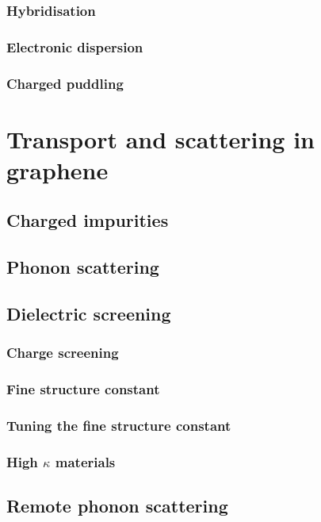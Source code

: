 \documentclass[../Matt_Gebert_Honours_Thesis.tex]{subfiles}
\begin{document}
	\subsubsection{Hybridisation}\label{sec:hybridisation}
	\subsubsection{Electronic dispersion}\label{sec:electronic_dispersion}
	\subsubsection{Charged puddling}\label{sec:charged_puddling}
	
	\section{Transport and scattering in graphene}\label{sec:transport&scattering}
	\subsection{Charged impurities}\label{sec:charged_impurities}
	\subsection{Phonon scattering}\label{sec:phonon_scattering}
	\subsection{Dielectric screening}\label{sec:dielectric_screening}
	\subsubsection{Charge screening}\label{sec:charge_screening}
	\subsubsection{Fine structure constant}\label{sec:fine_structure}
	\subsubsection{Tuning the fine structure constant}\label{sec:fine_structure_tuning}
	\subsubsection{High $\kappa$ materials}\label{sec:high_dielectrics}
	\subsection{Remote phonon scattering}\label{sec:remote_phonon_scattering}
	
	\section{}
	
	
	
\end{document}

